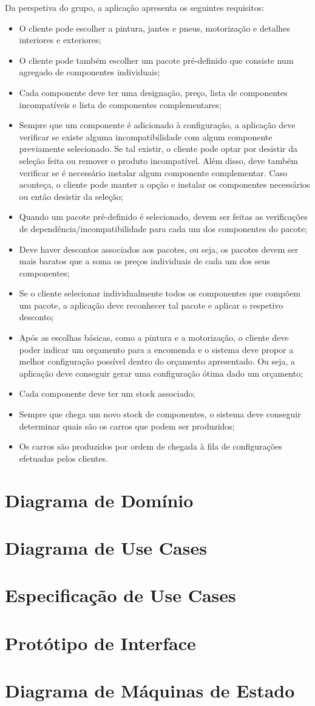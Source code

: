 \documentclass[11pt]{article} %
\begin{document}
Da perspetiva do grupo, a aplicação apresenta os seguintes requisitos:
\begin{itemize}
	\item O cliente pode escolher a pintura, jantes e pneus, motorização e detalhes interiores e exteriores;
	\item O cliente pode também escolher um pacote pré-definido que consiste num agregado de componentes individuais;
	\item Cada componente deve ter uma designação, preço, lista de componentes incompatíveis e lista de componentes complementares;
	\item Sempre que um componente é adicionado à configuração, a aplicação deve verificar se existe alguma incompatibilidade com algum componente previamente selecionado. Se tal existir, o cliente pode optar por desistir da seleção feita ou remover o produto incompatível. Além disso, deve também verificar se é necessário instalar algum componente complementar. Caso aconteça, o cliente pode manter a opção e instalar os componentes necessários ou então desistir da seleção;
	\item Quando um pacote pré-definido é selecionado, devem ser feitas as verificações de dependência/incompatibilidade para cada um dos componentes do pacote;
	\item Deve haver descontos associados aos pacotes, ou seja, os pacotes devem ser mais baratos que a soma os preços individuais de cada um dos seus componentes;
	\item Se o cliente selecionar individualmente todos os componentes que compõem um pacote, a aplicação deve reconhecer tal pacote e aplicar o respetivo desconto;
	\item Após as escolhas básicas, como a pintura e a motorização, o cliente deve poder indicar um orçamento para a encomenda e o sistema deve propor a melhor configuração possível dentro do orçamento apresentado. Ou seja, a aplicação deve conseguir gerar uma configuração ótima dado um orçamento;
	\item Cada componente deve ter um stock associado;
	\item Sempre que chega um novo stock de componentes, o sistema deve conseguir determinar quais são os carros que podem ser produzidos;
	\item Os carros são produzidos por ordem de chegada à fila de configurações efetuadas pelos clientes.
\end{itemize}

\section{Diagrama de Domínio}


\section{Diagrama de Use Cases}

\section{Especificação de Use Cases}

\section{Protótipo de Interface}

\section{Diagrama de Máquinas de Estado}
\end{document}
